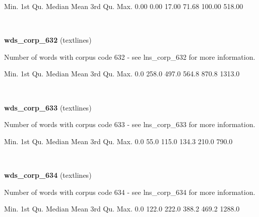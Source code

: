 \documentclass[]{article}
\newenvironment{Shaded}{\begin{snugshade}}{\end{snugshade}}
\newcommand{\FloatTok}[1]{\textcolor[rgb]{0.00,0.00,0.81}{{#1}}}
\newcommand{\NormalTok}[1]{{#1}}
\begin{document}
\begin{Shaded}
\begin{Highlighting}[]
   \NormalTok{Min. 1st Qu.  Median    Mean 3rd Qu.    Max. }
   \FloatTok{0.00}    \FloatTok{0.00}   \FloatTok{17.00}   \FloatTok{71.68}  \FloatTok{100.00}  \FloatTok{518.00} 
\end{Highlighting}
\end{Shaded}

~

\vspace{1em}

\textbf{wds\_corp\_632} (textlines)

Number of words with corpus code 632 - see lns\_corp\_632 for more
information.

\begin{Shaded}
\begin{Highlighting}[]
   \NormalTok{Min. 1st Qu.  Median    Mean 3rd Qu.    Max. }
    \FloatTok{0.0}   \FloatTok{258.0}   \FloatTok{497.0}   \FloatTok{564.8}   \FloatTok{870.8}  \FloatTok{1313.0} 
\end{Highlighting}
\end{Shaded}

~

\vspace{1em}

\textbf{wds\_corp\_633} (textlines)

Number of words with corpus code 633 - see lns\_corp\_633 for more
information.

\begin{Shaded}
\begin{Highlighting}[]
   \NormalTok{Min. 1st Qu.  Median    Mean 3rd Qu.    Max. }
    \FloatTok{0.0}    \FloatTok{55.0}   \FloatTok{115.0}   \FloatTok{134.3}   \FloatTok{210.0}   \FloatTok{790.0} 
\end{Highlighting}
\end{Shaded}

~

\vspace{1em}

\textbf{wds\_corp\_634} (textlines)

Number of words with corpus code 634 - see lns\_corp\_634 for more
information.

\begin{Shaded}
\begin{Highlighting}[]
   \NormalTok{Min. 1st Qu.  Median    Mean 3rd Qu.    Max. }
    \FloatTok{0.0}   \FloatTok{122.0}   \FloatTok{222.0}   \FloatTok{388.2}   \FloatTok{469.2}  \FloatTok{1288.0} 
\end{Highlighting}
\end{Shaded}
\end{document}
